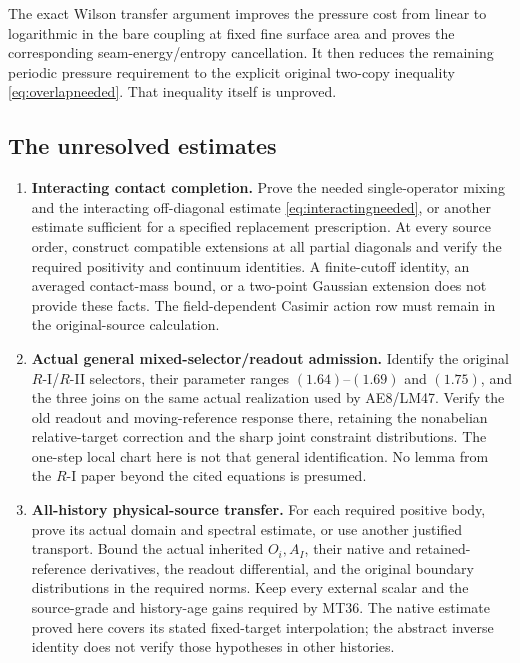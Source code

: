 \documentclass[11pt,letterpaper]{article}
\theoremstyle{plain}
\theoremstyle{remark}\newtheorem{remark}[theorem]{Scope}
\begin{document}
The exact Wilson transfer argument improves the pressure cost from linear
to logarithmic in the bare coupling at fixed fine surface area and proves
the corresponding seam-energy/entropy cancellation. It then reduces the
remaining periodic pressure requirement to the explicit original
two-copy inequality \eqref{eq:overlapneeded}. That inequality itself is unproved.

\subsection{The unresolved estimates}

\begin{enumerate}
\item \textbf{Interacting contact completion.}
Prove the needed single-operator mixing and the interacting off-diagonal
estimate \eqref{eq:interactingneeded}, or another estimate sufficient for a
specified replacement prescription. At every source order, construct compatible
extensions at all partial diagonals and verify the required positivity and
continuum identities. A finite-cutoff identity, an averaged contact-mass bound,
or a two-point Gaussian extension does not provide these facts. The
field-dependent Casimir action row must remain in the original-source calculation.

\item \textbf{Actual general mixed-selector/readout admission.}
Identify the original $R$-I/$R$-II selectors, their parameter ranges
$(1.64)$--$(1.69)$ and $(1.75)$, and the three joins on the same actual
realization used by AE8/LM47. Verify the old readout and moving-reference
response there, retaining the nonabelian relative-target correction and the
sharp joint constraint distributions. The one-step local chart here is not
that general identification. No lemma from the $R$-I paper beyond the cited
equations is presumed.

\item \textbf{All-history physical-source transfer.}
For each required positive body, prove its actual domain and spectral estimate,
or use another justified transport. Bound the actual inherited $O_i,A_I$,
their native and retained-reference derivatives, the readout differential,
and the original boundary distributions in the required norms. Keep every
external scalar and the source-grade and history-age gains required by MT36.
The native estimate proved here covers its stated fixed-target interpolation;
the abstract inverse identity does not verify those hypotheses in other histories.


\end{enumerate}
\end{document}
